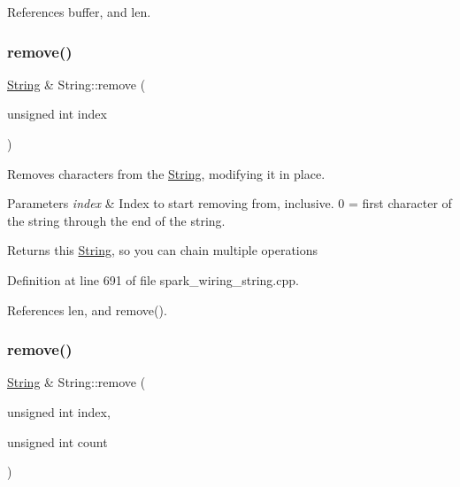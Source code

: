 References buffer, and len.

\mbox{\label{class_string_a01ab28577facf21ffc183a59983b259e}} 
\subsubsection{\texorpdfstring{remove()}{remove()}\hspace{0.1cm}{\footnotesize\ttfamily [1/2]}}
{\footnotesize\ttfamily \hyperlink{class_string}{String} \& String\+::remove (\begin{DoxyParamCaption}\item[{unsigned int}]{index }\end{DoxyParamCaption})}



Removes characters from the \hyperlink{class_string}{String}, modifying it in place. 


\begin{DoxyParams}{Parameters}
{\em index} & Index to start removing from, inclusive. 0 = first character of the string through the end of the string.\\
\hline
\end{DoxyParams}
\begin{DoxyReturn}{Returns}
this \hyperlink{class_string}{String}, so you can chain multiple operations 
\end{DoxyReturn}


Definition at line 691 of file spark\+\_\+wiring\+\_\+string.\+cpp.



References len, and remove().

\mbox{\label{class_string_a0c7e2c4875de0d99ad462aeac6da7ef9}} 
\subsubsection{\texorpdfstring{remove()}{remove()}\hspace{0.1cm}{\footnotesize\ttfamily [2/2]}}
{\footnotesize\ttfamily \hyperlink{class_string}{String} \& String\+::remove (\begin{DoxyParamCaption}\item[{unsigned int}]{index,  }\item[{unsigned int}]{count }\end{DoxyParamCaption})}



